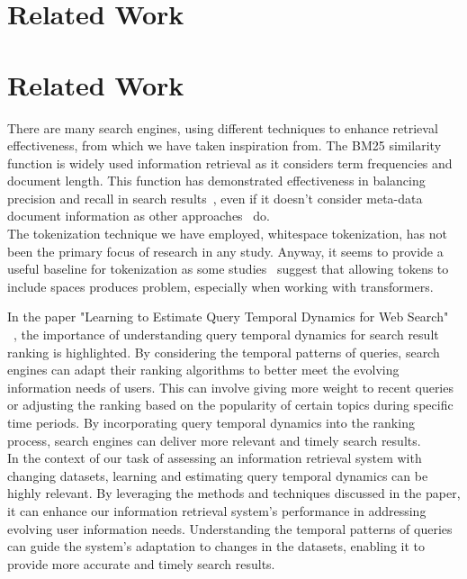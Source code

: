 \section{Related Work}
\label{sec:related}

\section{Related Work}
\label{sec:related}

There are many search engines, using different techniques to enhance retrieval effectiveness, from which we have taken
inspiration from.
The BM25 similarity function is widely used information retrieval as it considers term frequencies and document length.
This function has demonstrated effectiveness in balancing precision and recall in search results~\cite{BM25}, even if it
doesn't consider meta-data document information as other approaches~\cite{robertson2009probabilistic} do.\\

The tokenization technique we have employed, whitespace tokenization, has not been the primary focus of research in any
study.
Anyway, it seems to provide a useful baseline for tokenization as some studies~\cite{gowsmith2022improving} suggest that
allowing tokens to include spaces produces problem, especially when working with transformers.


In the paper "Learning to Estimate Query Temporal Dynamics for Web Search" ~\cite{cai2014learning}, 
the importance of understanding query temporal 
dynamics for search result ranking is highlighted. By considering the temporal patterns of 
queries, search engines can adapt their ranking algorithms to better meet the evolving information 
needs of users. This can involve giving more weight to recent queries or adjusting the ranking 
based on the popularity of certain topics during specific time periods. By incorporating query 
temporal dynamics into the ranking process, search engines can deliver more relevant and timely 
search results.\\

In the context of our task of assessing an information retrieval system with changing datasets, 
learning and estimating query temporal dynamics can be highly relevant. By leveraging the methods 
and techniques discussed in the paper, it can enhance our information retrieval system's performance 
in addressing evolving user information needs. Understanding the temporal patterns of queries can 
guide the system's adaptation to changes in the datasets, enabling it to provide more accurate and 
timely search results. \\


